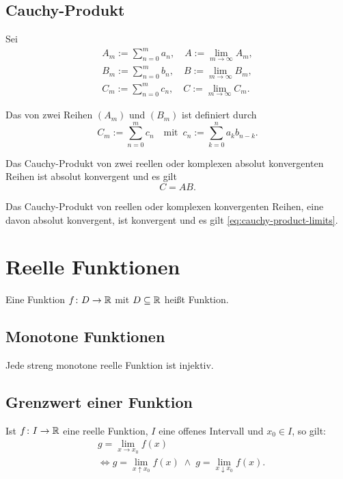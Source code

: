 \subsection{Cauchy-Produkt}
Sei
\begin{gather}
\textstyle A_m:=\sum_{n=0}^m a_n,\quad A:=\lim_{m\to\infty} A_m,\\
\textstyle B_m:=\sum_{n=0}^m b_n,\quad B:=\lim_{m\to\infty} B_m,\\
\textstyle C_m:=\sum_{n=0}^m c_n,\quad C:=\lim_{m\to\infty} C_m.
\end{gather}
\pagebreak[2]
\begin{definition}\mbox{}\newline
Das  von zwei Reihen $(A_m)$
und $(B_m)$ ist definiert durch
\begin{equation}
C_m:=\sum_{n=0}^m c_n
\quad\text{mit}\enspace
c_n := \sum_{k=0}^n a_k b_{n-k}.
\end{equation}
\end{definition}
\noindent
Das Cauchy-Produkt von zwei reellen oder komplexen
absolut konvergenten Reihen ist absolut konvergent und es gilt%
\begin{equation}\label{eq:cauchy-product-limits}
C = AB.
\end{equation}

\begin{Satz}
Das Cauchy-Produkt von reellen oder komplexen konvergenten Reihen,
eine davon absolut konvergent, ist konvergent und es gilt
\eqref{eq:cauchy-product-limits}.
\end{Satz}

\section{Reelle Funktionen}
\begin{definition}%
\mbox{}\newline
Eine Funktion $f\colon D\to\mathbb R$ mit $D\subseteq\mathbb R$
heißt  Funktion.
\end{definition}

\subsection{Monotone Funktionen}
Jede streng monotone reelle Funktion
ist injektiv.

\subsection{Grenzwert einer Funktion}
Ist $f\colon I\to\mathbb R$ eine reelle Funktion, $I$ eine offenes Intervall
und $x_0\in I$, so gilt:
\begin{equation}
\begin{split}
&g=\lim_{x\to x_0} f(x)\\
&\iff g=\lim_{x\uparrow x_0} f(x)\;\land\; g=\lim_{x\downarrow x_0} f(x).
\end{split}
\end{equation}

